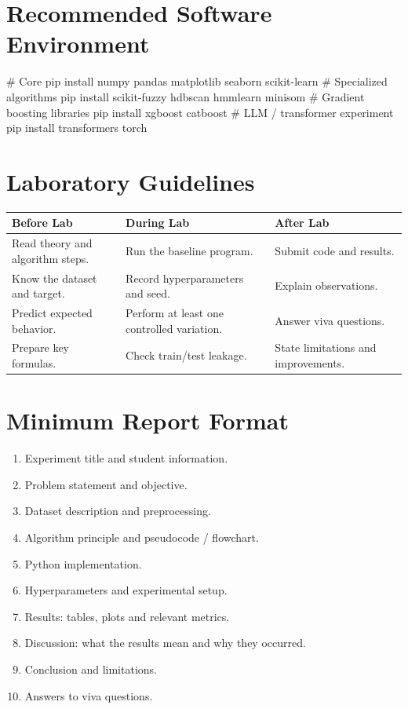 \section*{Recommended Software Environment}
{}
\begin{codebox}[title={Core and specialized libraries used by the manual},listing options={language=bash}]
# Core
pip install numpy pandas matplotlib seaborn scikit-learn
# Specialized algorithms
pip install scikit-fuzzy hdbscan hmmlearn minisom
# Gradient boosting libraries
pip install xgboost catboost
# LLM / transformer experiment
pip install transformers torch
\end{codebox}

\section*{Laboratory Guidelines}
{}
\begin{longtable}{|p{}|p{}|p{}|}
\hline
\rowcolor{mlblue!8}\textbf{Before Lab} & \textbf{During Lab} & \textbf{After Lab} \\
\hline
\endhead
Read theory and algorithm steps. & Run the baseline program. & Submit code and results. \\
\hline
Know the dataset and target. & Record hyperparameters and seed. & Explain observations. \\
\hline
Predict expected behavior. & Perform at least one controlled variation. & Answer viva questions. \\
\hline
Prepare key formulas. & Check train/test leakage. & State limitations and improvements. \\
\hline
\end{longtable}

\section*{Minimum Report Format}
{}
\begin{enumerate}
  \item Experiment title and student information.
  \item Problem statement and objective.
  \item Dataset description and preprocessing.
  \item Algorithm principle and pseudocode / flowchart.
  \item Python implementation.
  \item Hyperparameters and experimental setup.
  \item Results: tables, plots and relevant metrics.
  \item Discussion: what the results mean and why they occurred.
  \item Conclusion and limitations.
  \item Answers to viva questions.
\end{enumerate}

